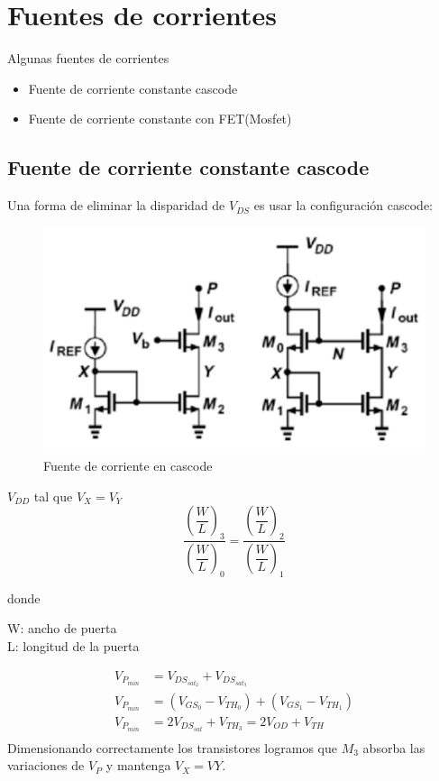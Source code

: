 \documentclass[conference]{IEEEtran} %
\begin{document}
\section{Fuentes de corrientes}
Algunas fuentes de corrientes
\begin{itemize}
	\item Fuente de corriente constante cascode
	\item Fuente de corriente constante con FET(Mosfet)
\end{itemize}


\subsection{Fuente de corriente constante cascode}

Una forma de eliminar la disparidad de $V_{DS}$ es usar la configuración cascode:
\begin{figure}
	\centering
	\includegraphics[scale=0.5]{IMAGENES/image3.png}
	\caption{Fuente de corriente en cascode}
	\label{image3}
\end{figure}



$V_{DD}$ tal que $V_X = V_Y$
$$\dfrac{\left(\dfrac{W}{L}\right)_3}
{\left(\dfrac{W}{L}\right)_0} = 
\dfrac{\left(\dfrac{W}{L}\right)_2}
{\left(\dfrac{W}{L}\right)_1}$$ 

donde
\begin{center}
	\hspace{-5mm}W: ancho de puerta\\
	L: longitud de la puerta
\end{center}



\begin{align}
	V_{P_{min}} &= V_{DS_{sat_{2}}} + V_{DS_{sat_3}} \\
	V_{P_{min}} &= (V_{GS_0} - V_{TH_0}) + (V_{GS_1} - V_{TH_1}) \\
	V_{P_{min}} &= 2V_{DS_{sat}} + V_{TH_3} = 2V_{OD} + V_{TH} \\
\end{align}
Dimensionando correctamente los transistores logramos que $M_3$
absorba las variaciones de $V_P$ y mantenga $V_X = VY$.\newline
\end{document}
